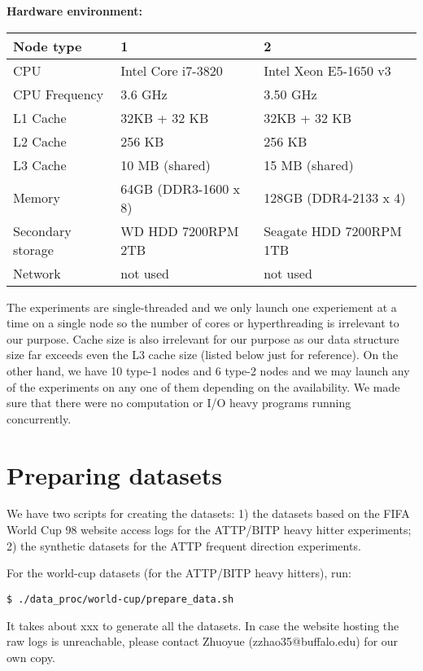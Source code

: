 \documentclass[11pt]{article}
\begin{document}
\newpage
{\bf Hardware environment:}

\vspace{1mm}
\begin{tabular}{|l|l|l|}
	\hline
	Node type &  1 & 2 \\\hline
	CPU & Intel Core i7-3820 & Intel Xeon E5-1650 v3 \\\hline
	CPU Frequency & 3.6 GHz & 3.50 GHz \\\hline
	L1 Cache & 32KB + 32 KB & 32KB + 32 KB\\\hline
	L2 Cache & 256 KB & 256 KB\\\hline
	L3 Cache & 10 MB (shared) & 15 MB (shared) \\\hline
	Memory & 64GB (DDR3-1600 x 8) & 128GB (DDR4-2133 x 4) \\\hline
	Secondary storage & WD HDD 7200RPM 2TB & Seagate HDD 7200RPM 1TB
	\\\hline
	Network & not used & not used \\\hline
\end{tabular}
\vspace{1mm}

The experiments are single-threaded and we only
launch one experiement at a time on a single node so the number of
cores or hyperthreading is irrelevant to our purpose. Cache size is
also irrelevant for our purpose as our data structure size far exceeds
even the L3 cache size (listed below just for reference). On the other
hand, we have 10 type-1 nodes and 6 type-2 nodes and we may launch any
of the experiments on any one of them depending on the availability.
We made sure that there were no computation or I/O heavy programs
running concurrently.

\section{Preparing datasets}

We have two scripts for creating the datasets: 1) the datasets based
on the FIFA World Cup 98 website access logs for the ATTP/BITP heavy
hitter experiments; 2) the synthetic datasets for the ATTP
frequent direction experiments. 

For the world-cup datasets (for the ATTP/BITP heavy hitters), run:
\begin{verbatim}
$ ./data_proc/world-cup/prepare_data.sh
\end{verbatim}
It takes about xxx to generate all the datasets. In case the website
hosting the raw logs is unreachable, please contact Zhuoyue
(zzhao35@buffalo.edu) for our own copy.
\end{document}

